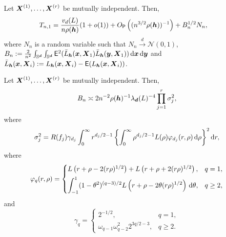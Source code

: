 \documentclass[oneside,11pt]{article}
\begin{document}


\begin{lemma}\label{lemma-in1}
 Let $\boldsymbol{X}^{(1)}, \dots, \boldsymbol{X}^{(r)}$ be mutually independent. Then,
    \begin{align*}
        T_{n,1} &= \frac{v_d(L)}{n \rho ({\boldsymbol{h}})} (1+o(1)) + O_{\mathsf{P}}\left((n^{3/2} \rho ({\boldsymbol{h}}))^{-1}\right) + B_n^{1/2} N_n,
    \end{align*}
    where $N_n$ is a random variable such that $N_n \xrightarrow{d} \mathcal{N}(0, 1)$, $B_n := \frac{2}{n^2} \int_{\mathbb{S}^{\boldsymbol{d}}} \int_{\mathbb{S}^{\boldsymbol{d}}} \mathsf{E}^2 ( \bar{L}_{{\boldsymbol{h}}} (\boldsymbol{x},\boldsymbol{X}_1) \bar{L}_{{\boldsymbol{h}}} (\boldsymbol{y},\boldsymbol{X}_1) ) \,\mathrm{d} \boldsymbol{x} \,\mathrm{d} \boldsymbol{y}$ and $\bar{L}_{{\boldsymbol{h}}} (\boldsymbol{x},\boldsymbol{X}_i) := L_{{\boldsymbol{h}}} (\boldsymbol{x},\boldsymbol{X}_i) - \mathsf{E} (L_{{\boldsymbol{h}}} (\boldsymbol{x},\boldsymbol{X}_i))$.
\end{lemma}

\begin{lemma}\label{lemma-sigma2}
Let $\boldsymbol{X}^{(1)}, \dots, \boldsymbol{X}^{(r)}$ be mutually independent. Then,
\begin{align*}
    B_n \asymp 2 n^{-2} \rho({\boldsymbol{h}})^{-1} \lambda_{\boldsymbol{d}}(L)^{-4}  \prod_{j=1}^{r} \sigma_j^2,
\end{align*}
where
\[
\sigma_j^2
=
R(f_j)\gamma_{d_j}
\int_0^\infty
r^{d_j/2-1}
\left\{
\int_0^\infty
\rho^{d_j/2-1}L(\rho)\varphi_{d_j}(r,\rho)
\,\mathrm{d}\rho
\right\}^2
\mathrm{d} r,
\]
where
\[
\varphi_q(r,\rho)
=
\begin{cases}
L\left(r+\rho-2(r\rho)^{1/2}\right)
+
L\left(r+\rho+2(r\rho)^{1/2}\right),
& q=1,\\[0.4em]
\displaystyle
\int_{-1}^{1}
(1-\theta^2)^{(q-3)/2}
L\left(r+\rho-2\theta(r\rho)^{1/2}\right)
\,\mathrm{d}\theta,
& q\ge 2,
\end{cases}
\]
and
\[
\gamma_q
=
\begin{cases}
2^{-1/2}, & q=1,\\[0.3em]
\omega_{q-1}\omega_{q-2}^2 2^{3q/2-3}, & q\ge 2.
\end{cases}
\]
\end{lemma}
\end{document}
